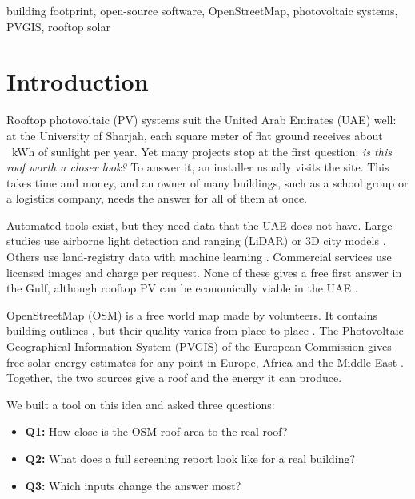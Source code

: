 \documentclass[conference]{IEEEtran}
\begin{document}
\begin{IEEEkeywords}
building footprint, open-source software, OpenStreetMap, photovoltaic systems, PVGIS, rooftop solar
\end{IEEEkeywords}

\section{Introduction}

Rooftop photovoltaic (PV) systems suit the United Arab Emirates (UAE) well: at the University of Sharjah, each square meter of flat ground receives about \Ghi~kWh of sunlight per year. Yet many projects stop at the first question: \emph{is this roof worth a closer look?} To answer it, an installer usually visits the site. This takes time and money, and an owner of many buildings, such as a school group or a logistics company, needs the answer for all of them at once.

Automated tools exist, but they need data that the UAE does not have. Large studies use airborne light detection and ranging (LiDAR) or 3D city models \cite{walch2020, gagnon2018}. Others use land-registry data with machine learning \cite{assouline2018}. Commercial services use licensed images and charge per request. None of these gives a free first answer in the Gulf, although rooftop PV can be economically viable in the UAE \cite{griffiths2016, alhammami2021}.

OpenStreetMap (OSM) is a free world map made by volunteers. It contains building outlines \cite{haklay2008}, but their quality varies from place to place \cite{hecht2013, fan2014, brovelli2018, biljecki2023}. The Photovoltaic Geographical Information System (PVGIS) of the European Commission gives free solar energy estimates for any point in Europe, Africa and the Middle East \cite{huld2012}. Together, the two sources give a roof and the energy it can produce.

We built a tool on this idea and asked three questions:
\begin{itemize}
\item \textbf{Q1:} How close is the OSM roof area to the real roof?
\item \textbf{Q2:} What does a full screening report look like for a real building?
\item \textbf{Q3:} Which inputs change the answer most?
\end{itemize}
\end{document}

